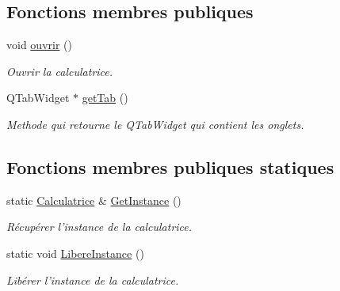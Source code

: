 \subsection*{Fonctions membres publiques}
\begin{DoxyCompactItemize}
\item 
\hypertarget{class_calculatrice_ab75e00a30639b810fbaf1c8492b0dc29}{void \hyperlink{class_calculatrice_ab75e00a30639b810fbaf1c8492b0dc29}{ouvrir} ()}\label{class_calculatrice_ab75e00a30639b810fbaf1c8492b0dc29}

\begin{DoxyCompactList}\small\item\em Ouvrir la calculatrice. \end{DoxyCompactList}\item 
Q\-Tab\-Widget $\ast$ \hyperlink{class_calculatrice_aef0bdca98f5cafc0e28183b923ae50a3}{get\-Tab} ()
\begin{DoxyCompactList}\small\item\em Methode qui retourne le Q\-Tab\-Widget qui contient les onglets. \end{DoxyCompactList}\end{DoxyCompactItemize}
\subsection*{Fonctions membres publiques statiques}
\begin{DoxyCompactItemize}
\item 
\hypertarget{class_calculatrice_ae0e574f8aa45146ba02bc609ccb2e8a8}{static \hyperlink{class_calculatrice}{Calculatrice} \& \hyperlink{class_calculatrice_ae0e574f8aa45146ba02bc609ccb2e8a8}{Get\-Instance} ()}\label{class_calculatrice_ae0e574f8aa45146ba02bc609ccb2e8a8}

\begin{DoxyCompactList}\small\item\em Récupérer l'instance de la calculatrice. \end{DoxyCompactList}\item 
\hypertarget{class_calculatrice_ae7633e9ed55d260d2ce81792a0d2aee2}{static void \hyperlink{class_calculatrice_ae7633e9ed55d260d2ce81792a0d2aee2}{Libere\-Instance} ()}\label{class_calculatrice_ae7633e9ed55d260d2ce81792a0d2aee2}

\begin{DoxyCompactList}\small\item\em Libérer l'instance de la calculatrice. \end{DoxyCompactList}\end{DoxyCompactItemize}


